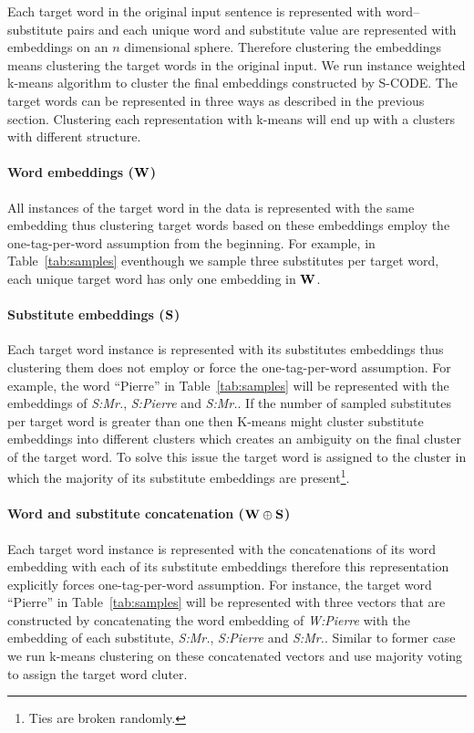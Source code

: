 Each target word in the original input sentence is represented with
word--substitute pairs and each unique word and substitute value are
represented with embeddings on an $n$ dimensional sphere.  Therefore
clustering the embeddings means clustering the target words in the
original input.  We run instance weighted k-means algorithm to cluster
the final embeddings constructed by S-CODE.  The target words can be
represented in three ways as described in the previous section.
Clustering each representation with k-means will end up with a
clusters with different structure.

\paragraph{Word embeddings (${\bf W}$)} All instances of the target
word in the data is represented with the same embedding thus
clustering target words based on these embeddings employ the
one-tag-per-word assumption from the beginning.  For example, in
Table~\ref{tab:samples} eventhough we sample three substitutes per
target word, each unique target word has only one embedding in ${\bf
  W}$.

\paragraph{Substitute embeddings (${\bf S}$)} Each target word instance
is represented with its substitutes embeddings thus clustering them
does not employ or force the one-tag-per-word assumption.  For
example, the word ``Pierre'' in Table~\ref{tab:samples} will be
represented with the embeddings of {\it S:Mr.}, {\it S:Pierre} and
{\it S:Mr.}.  If the number of sampled substitutes per target word is
greater than one then K-means might cluster substitute embeddings into
different clusters which creates an ambiguity on the final cluster of
the target word.  To solve this issue the target word is assigned to
the cluster in which the majority of its substitute embeddings are
present\footnote{Ties are broken randomly.}.

\paragraph{Word and substitute concatenation (${\bf W\oplus S}$)} 
Each target word instance is represented with the concatenations of
its word embedding with each of its substitute embeddings therefore
this representation explicitly forces one-tag-per-word assumption.
For instance, the target word ``Pierre'' in Table~\ref{tab:samples}
will be represented with three vectors that are constructed by
concatenating the word embedding of {\it W:Pierre} with the embedding
of each substitute, {\it S:Mr.}, {\it S:Pierre} and {\it S:Mr.}.
Similar to former case we run k-means clustering on these concatenated
vectors and use majority voting to assign the target word cluter.

